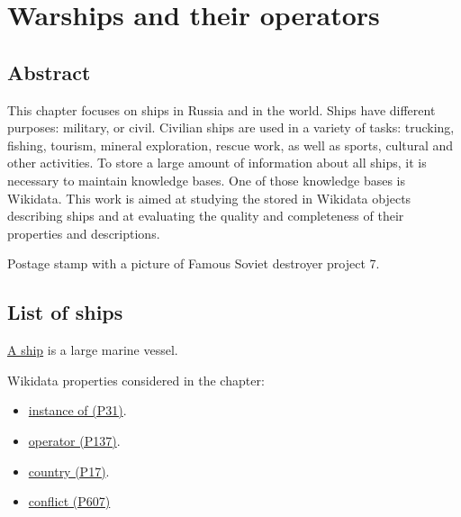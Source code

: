 \setchapterpreamble[u]{\margintoc}
\chapter{Warships and their operators\protect\footnotemark}


\section{Abstract}

This chapter focuses on ships in Russia and in the world. Ships have different purposes: military, or civil. Civilian ships are used in a variety of tasks: trucking, fishing, tourism, mineral exploration, rescue work, as well as sports, cultural and other activities. To store a large amount of information about all ships, it is necessary to maintain knowledge bases. One of those knowledge bases is Wikidata. This work is aimed at studying the stored in Wikidata objects describing ships and at evaluating the quality and completeness of their properties and descriptions.

\begin{marginfigure}[0.0cm]
  {
    \setlength{\fboxsep}{0pt}%
    \setlength{\fboxrule}{1pt}%
  }
  \caption[Soviet destroyer project 7]{Postage stamp with a picture of Famous Soviet destroyer project 7.}%
  \label{fig:quiz_question_ship}%
\end{marginfigure}

\section{List of ships}

\href{https://en.wikipedia.org/wiki/Ship}{A ship} is a large marine vessel.



Wikidata properties considered in the chapter: 
\begin{itemize}
  \item \href{https://www.wikidata.org/wiki/Property:P31}{instance of (P31)}.
  \item \href{https://www.wikidata.org/wiki/Property:P137}{operator (P137)}.
  \item \href{https://www.wikidata.org/wiki/Property:P17}{country (P17)}.
  \item \href{https://www.wikidata.org/wiki/Property:P607}{conflict (P607)}
\end{itemize}

